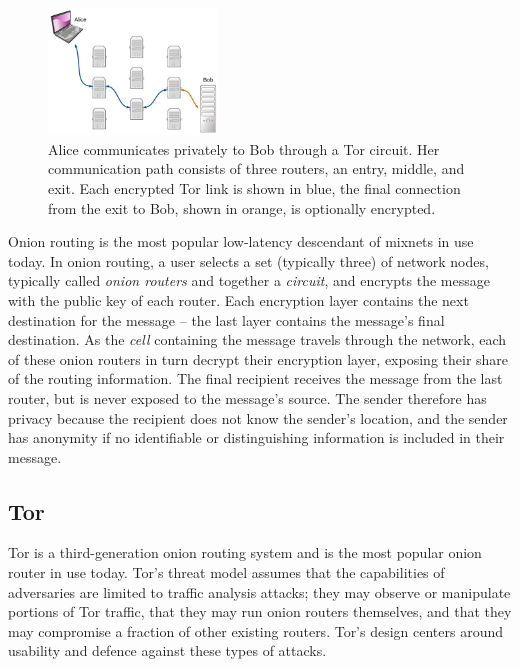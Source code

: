 \documentclass{sig-alternate}
\begin{document}
\begin{figure}[htbp]
	\centering
	\includegraphics[width=0.4\textwidth]{../images/LucidCharts/Tor_Circuit.pdf}
	\caption{Alice communicates privately to Bob through a Tor circuit. Her communication path consists of three routers, an entry, middle, and exit. Each encrypted Tor link is shown in blue, the final connection from the exit to Bob, shown in orange, is optionally encrypted.}
\end{figure}

Onion routing is the most popular low-latency descendant of mixnets in use today. In onion routing, a user selects a set (typically three) of network nodes, typically called \emph{onion routers} and together a \emph{circuit}, and encrypts the message with the public key of each router. Each encryption layer contains the next destination for the message -- the last layer contains the message's final destination. As the \emph{cell} containing the message travels through the network, each of these onion routers in turn decrypt their encryption layer, exposing their share of the routing information. The final recipient receives the message from the last router, but is never exposed to the message's source. The sender therefore has privacy because the recipient does not know the sender's location, and the sender has anonymity if no identifiable or distinguishing information is included in their message.

\newpage

\subsection{Tor} %

Tor\cite{dingledine2004tor} is a third-generation onion routing system and is the most popular onion router in use today. Tor's threat model assumes that the capabilities of adversaries are limited to traffic analysis attacks; they may observe or manipulate portions of Tor traffic, that they may run onion routers themselves, and that they may compromise a fraction of other existing routers. Tor's design centers around usability and defence against these types of attacks.
\end{document}
